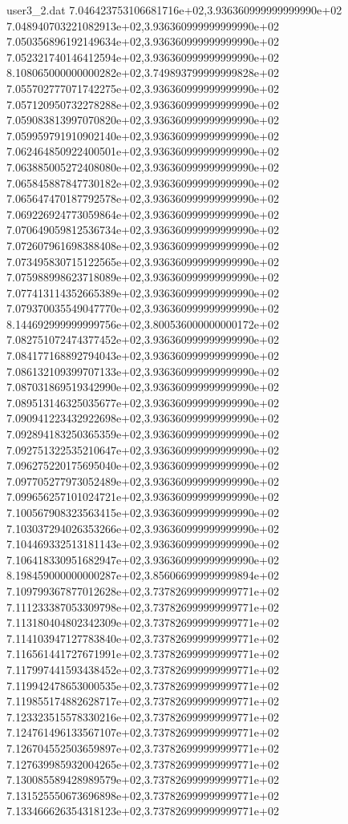 \begin{filecontents}{user3_2.dat}
7.046423753106681716e+02,3.936360999999999990e+02
7.048940703221082913e+02,3.936360999999999990e+02
7.050356896192149634e+02,3.936360999999999990e+02
7.052321740146412594e+02,3.936360999999999990e+02
8.108065000000000282e+02,3.749893799999999828e+02
7.055702777071742275e+02,3.936360999999999990e+02
7.057120950732278288e+02,3.936360999999999990e+02
7.059083813997070820e+02,3.936360999999999990e+02
7.059959791910902140e+02,3.936360999999999990e+02
7.062464850922400501e+02,3.936360999999999990e+02
7.063885005272408080e+02,3.936360999999999990e+02
7.065845887847730182e+02,3.936360999999999990e+02
7.065647470187792578e+02,3.936360999999999990e+02
7.069226924773059864e+02,3.936360999999999990e+02
7.070649059812536734e+02,3.936360999999999990e+02
7.072607961698388408e+02,3.936360999999999990e+02
7.073495830715122565e+02,3.936360999999999990e+02
7.075988998623718089e+02,3.936360999999999990e+02
7.077413114352665389e+02,3.936360999999999990e+02
7.079370035549047770e+02,3.936360999999999990e+02
8.144692999999999756e+02,3.800536000000000172e+02
7.082751072474377452e+02,3.936360999999999990e+02
7.084177168892794043e+02,3.936360999999999990e+02
7.086132109399707133e+02,3.936360999999999990e+02
7.087031869519342990e+02,3.936360999999999990e+02
7.089513146325035677e+02,3.936360999999999990e+02
7.090941223432922698e+02,3.936360999999999990e+02
7.092894183250365359e+02,3.936360999999999990e+02
7.092751322535210647e+02,3.936360999999999990e+02
7.096275220175695040e+02,3.936360999999999990e+02
7.097705277973052489e+02,3.936360999999999990e+02
7.099656257101024721e+02,3.936360999999999990e+02
7.100567908323563415e+02,3.936360999999999990e+02
7.103037294026353266e+02,3.936360999999999990e+02
7.104469332513181143e+02,3.936360999999999990e+02
7.106418330951682947e+02,3.936360999999999990e+02
8.198459000000000287e+02,3.856066999999999894e+02
7.109799367877012628e+02,3.737826999999999771e+02
7.111233387053309798e+02,3.737826999999999771e+02
7.113180404802342309e+02,3.737826999999999771e+02
7.114103947127783840e+02,3.737826999999999771e+02
7.116561441727671991e+02,3.737826999999999771e+02
7.117997441593438452e+02,3.737826999999999771e+02
7.119942478653000535e+02,3.737826999999999771e+02
7.119855174882628717e+02,3.737826999999999771e+02
7.123323515578330216e+02,3.737826999999999771e+02
7.124761496133567107e+02,3.737826999999999771e+02
7.126704552503659897e+02,3.737826999999999771e+02
7.127639985932004265e+02,3.737826999999999771e+02
7.130085589428989579e+02,3.737826999999999771e+02
7.131525550673696898e+02,3.737826999999999771e+02
7.133466626354318123e+02,3.737826999999999771e+02

\end{filecontents}
